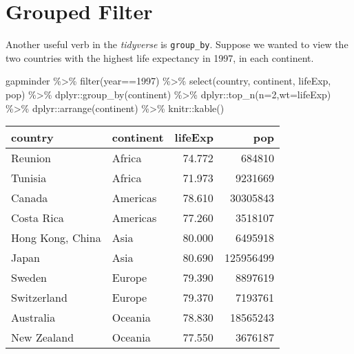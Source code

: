 \documentclass[
]{book}
\newenvironment{Shaded}{\begin{snugshade}}{\end{snugshade}}
\newcommand{\AttributeTok}[1]{\textcolor[rgb]{0.77,0.63,0.00}{#1}}
\newcommand{\DecValTok}[1]{\textcolor[rgb]{0.00,0.00,0.81}{#1}}
\newcommand{\FunctionTok}[1]{\textcolor[rgb]{0.00,0.00,0.00}{#1}}
\newcommand{\NormalTok}[1]{#1}
\newcommand{\SpecialCharTok}[1]{\textcolor[rgb]{0.00,0.00,0.00}{#1}}
\begin{document}
\hypertarget{grouped-filter}{%
\section{Grouped Filter}\label{grouped-filter}}

Another useful verb in the \emph{tidyverse} is \texttt{group\_by}. Suppose we wanted to view the two countries with the highest life expectancy in 1997, in each continent.

\begin{Shaded}
\begin{Highlighting}[]
\NormalTok{gapminder }\SpecialCharTok{\%\textgreater{}\%} 
  \FunctionTok{filter}\NormalTok{(year}\SpecialCharTok{==}\DecValTok{1997}\NormalTok{) }\SpecialCharTok{\%\textgreater{}\%}  
  \FunctionTok{select}\NormalTok{(country, continent, lifeExp, pop) }\SpecialCharTok{\%\textgreater{}\%}
\NormalTok{  dplyr}\SpecialCharTok{::}\FunctionTok{group\_by}\NormalTok{(continent) }\SpecialCharTok{\%\textgreater{}\%}
\NormalTok{  dplyr}\SpecialCharTok{::}\FunctionTok{top\_n}\NormalTok{(}\AttributeTok{n=}\DecValTok{2}\NormalTok{,}\AttributeTok{wt=}\NormalTok{lifeExp) }\SpecialCharTok{\%\textgreater{}\%}
\NormalTok{  dplyr}\SpecialCharTok{::}\FunctionTok{arrange}\NormalTok{(continent) }\SpecialCharTok{\%\textgreater{}\%}
\NormalTok{  knitr}\SpecialCharTok{::}\FunctionTok{kable}\NormalTok{()}
\end{Highlighting}
\end{Shaded}

\begin{tabular}{l|l|r|r}
\hline
country & continent & lifeExp & pop\\
\hline
Reunion & Africa & 74.772 & 684810\\
\hline
Tunisia & Africa & 71.973 & 9231669\\
\hline
Canada & Americas & 78.610 & 30305843\\
\hline
Costa Rica & Americas & 77.260 & 3518107\\
\hline
Hong Kong, China & Asia & 80.000 & 6495918\\
\hline
Japan & Asia & 80.690 & 125956499\\
\hline
Sweden & Europe & 79.390 & 8897619\\
\hline
Switzerland & Europe & 79.370 & 7193761\\
\hline
Australia & Oceania & 78.830 & 18565243\\
\hline
New Zealand & Oceania & 77.550 & 3676187\\
\hline
\end{tabular}
\end{document}
